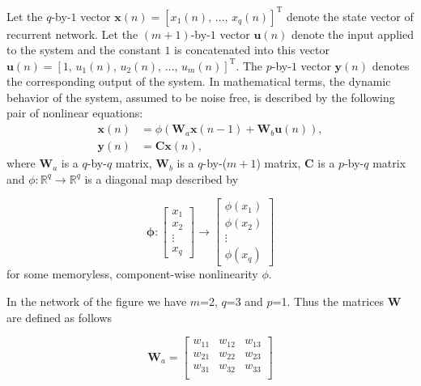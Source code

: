 \begin{enumerate}
\begin{solution}
\begin{enumerate}
      Let the $q$-by-$1$ vector
      $\mathbf{x}(n)=[x_1(n),\,\ldots,\,x_q(n)]^{\mathrm{T}}$ denote
      the state vector of recurrent network. Let the $(m+1)$-by-$1$
      vector $\mathbf{u}(n)$ denote the input applied to the system
      and the constant $1$ is concatenated into this vector
      $\mathbf{u}(n)=[1,\,u_1(n),\,u_2(n),\,\ldots,\,u_m(n)]^{\mathrm{T}}$.
      The $p$-by-$1$ vector $\mathbf{y}(n)$ denotes the corresponding
      output of the system.  In mathematical terms, the dynamic
      behavior of the system, assumed to be noise free, is described
      by the following pair of nonlinear equations:
      \begin{align*}
        \mathbf{x}(n) &= \phi \left( \mathbf{W}_a \mathbf{x}(n-1) +
          \mathbf{W}_b \mathbf{u}(n) \right), \\
        \mathbf{y}(n) &= \mathbf{C} \mathbf{x}(n),
      \end{align*}
      where $\mathbf{W}_a$ is a $q$-by-$q$ matrix, $\mathbf{W}_b$ is a
      $q$-by-($m+1$) matrix, $\mathbf{C}$ is a $p$-by-$q$ matrix and
      $\phi: \mathbb{R}^q \rightarrow \mathbb{R}^q$ is a diagonal map
      described by

      \[
      \boldsymbol{\phi}:
      \left[\begin{array}{c}
          x_1 \\
          x_2 \\
          \vdots \\
          x_q
        \end{array}\right]
      \rightarrow
      \left[\begin{array}{c}
          \phi(x_1) \\
          \phi(x_2) \\
          \vdots \\
          \phi(x_q)
        \end{array}\right]
      \]
      for some memoryless, component-wise nonlinearity $\phi$.

      In the network of the figure we have $m$=2, $q$=3 and $p$=1. Thus the
      matrices $\mathbf{W}$ are defined as follows

      \[
      \mathbf{W}_a = 
      \left[\begin{array}{ccc}
          w_{11} & w_{12} & w_{13} \\
          w_{21} & w_{22} & w_{23} \\
          w_{31} & w_{32} & w_{33} \\
        \end{array}\right]
      \]


\end{enumerate}
\end{solution}
\end{enumerate}
